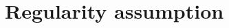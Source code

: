 \documentclass{article}
\newcommand{\1}{\mathbf{1}}
\begin{document}
%
%
%
%
%
%
%
%
%









\section{Regularity assumption} \label{apdx:regularity}
\end{document}
